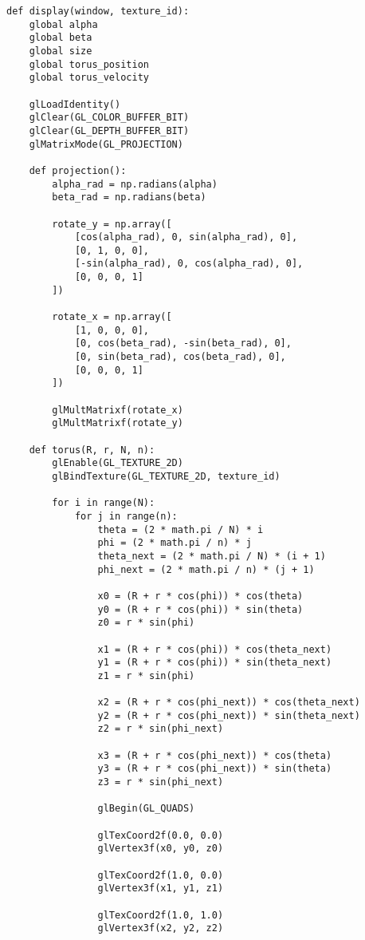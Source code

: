 \documentclass[a4paper, 14pt]{extarticle}
\begin{document}
\begin{lstlisting}
def display(window, texture_id):
    global alpha
    global beta
    global size
    global torus_position
    global torus_velocity

    glLoadIdentity()
    glClear(GL_COLOR_BUFFER_BIT)
    glClear(GL_DEPTH_BUFFER_BIT)
    glMatrixMode(GL_PROJECTION)

    def projection():
        alpha_rad = np.radians(alpha)
        beta_rad = np.radians(beta)

        rotate_y = np.array([
            [cos(alpha_rad), 0, sin(alpha_rad), 0],
            [0, 1, 0, 0],
            [-sin(alpha_rad), 0, cos(alpha_rad), 0],
            [0, 0, 0, 1]
        ])

        rotate_x = np.array([
            [1, 0, 0, 0],
            [0, cos(beta_rad), -sin(beta_rad), 0],
            [0, sin(beta_rad), cos(beta_rad), 0],
            [0, 0, 0, 1]
        ])

        glMultMatrixf(rotate_x)
        glMultMatrixf(rotate_y)

    def torus(R, r, N, n):
        glEnable(GL_TEXTURE_2D)
        glBindTexture(GL_TEXTURE_2D, texture_id)

        for i in range(N):
            for j in range(n):
                theta = (2 * math.pi / N) * i
                phi = (2 * math.pi / n) * j
                theta_next = (2 * math.pi / N) * (i + 1)
                phi_next = (2 * math.pi / n) * (j + 1)

                x0 = (R + r * cos(phi)) * cos(theta)
                y0 = (R + r * cos(phi)) * sin(theta)
                z0 = r * sin(phi)

                x1 = (R + r * cos(phi)) * cos(theta_next)
                y1 = (R + r * cos(phi)) * sin(theta_next)
                z1 = r * sin(phi)

                x2 = (R + r * cos(phi_next)) * cos(theta_next)
                y2 = (R + r * cos(phi_next)) * sin(theta_next)
                z2 = r * sin(phi_next)

                x3 = (R + r * cos(phi_next)) * cos(theta)
                y3 = (R + r * cos(phi_next)) * sin(theta)
                z3 = r * sin(phi_next)

                glBegin(GL_QUADS)

                glTexCoord2f(0.0, 0.0)
                glVertex3f(x0, y0, z0)

                glTexCoord2f(1.0, 0.0)
                glVertex3f(x1, y1, z1)

                glTexCoord2f(1.0, 1.0)
                glVertex3f(x2, y2, z2)


\end{lstlisting}
\end{document}
